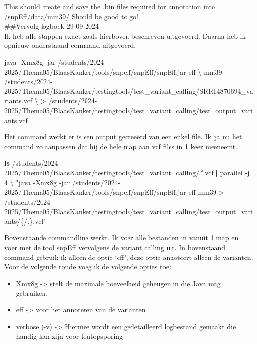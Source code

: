 \documentclass[
]{article}
\newenvironment{Shaded}{\begin{snugshade}}{\end{snugshade}}
\newcommand{\AttributeTok}[1]{\textcolor[rgb]{0.13,0.29,0.53}{#1}}
\newcommand{\DataTypeTok}[1]{\textcolor[rgb]{0.13,0.29,0.53}{#1}}
\newcommand{\ExtensionTok}[1]{#1}
\newcommand{\FunctionTok}[1]{\textcolor[rgb]{0.13,0.29,0.53}{\textbf{#1}}}
\newcommand{\KeywordTok}[1]{\textcolor[rgb]{0.13,0.29,0.53}{\textbf{#1}}}
\newcommand{\NormalTok}[1]{#1}
\newcommand{\OperatorTok}[1]{\textcolor[rgb]{0.81,0.36,0.00}{\textbf{#1}}}
\newcommand{\PreprocessorTok}[1]{\textcolor[rgb]{0.56,0.35,0.01}{\textit{#1}}}
\newcommand{\StringTok}[1]{\textcolor[rgb]{0.31,0.60,0.02}{#1}}
\providecommand{\tightlist}{%
  \setlength{\itemsep}{0pt}\setlength{\parskip}{0pt}}
\begin{document}
This should create and save the .bin files required for annotation into
/snpEff/data/mm39/ Should be good to go!\\

\#\#Vervolg logboek 29-09-2024\\
Ik heb alle stappen exact zoals hierboven beschreven uitgevoerd. Daarna
heb ik opnieuw onderstaand command uitgevoerd.\\

\begin{Shaded}
\begin{Highlighting}[]
\ExtensionTok{java} \AttributeTok{{-}Xmx8g} \AttributeTok{{-}jar}\NormalTok{ /students/2024{-}2025/Thema05/BlaasKanker/tools/snpeff/snpEff/snpEff.jar eff }\DataTypeTok{\textbackslash{}}
\NormalTok{mm39 /students/2024{-}2025/Thema05/BlaasKanker/testingtools/test\_variant\_calling/SRR14870694\_variants.vcf }\DataTypeTok{\textbackslash{}}
\OperatorTok{\textgreater{}}\NormalTok{ /students/2024{-}2025/Thema05/BlaasKanker/testingtools/test\_variant\_calling/test\_output\_variants.vcf}
\end{Highlighting}
\end{Shaded}

Het command werkt er is een output gecreeërd van een enkel file. Ik ga
nu het command zo aanpassen dat hij de hele map aan vcf files in 1 keer
meeneemt.\\

\begin{Shaded}
\begin{Highlighting}[]
\FunctionTok{ls}\NormalTok{ /students/2024{-}2025/Thema05/BlaasKanker/testingtools/test\_variant\_calling/}\PreprocessorTok{*}\NormalTok{.vcf }\KeywordTok{|} \ExtensionTok{parallel} \AttributeTok{{-}j}\NormalTok{ 4 }\DataTypeTok{\textbackslash{}}
\StringTok{"java {-}Xmx8g {-}jar /students/2024{-}2025/Thema05/BlaasKanker/tools/snpeff/snpEff/snpEff.jar eff mm39 \textgreater{} /students/2024{-}2025/Thema05/BlaasKanker/testingtools/test\_variant\_calling/test\_output\_variants/\{/.\}.vcf"}
\end{Highlighting}
\end{Shaded}

Bovenstaande commandline werkt. Ik voer alle bestanden in vanuit 1 map
en voer met de tool snpEff vervolgens de variant calling uit. In
bovenstaand command gebruik ik alleen de optie `eff', deze optie
annoteert alleen de varianten. Voor de volgende ronde voeg ik de
volgende opties toe:\\

\begin{itemize}
\tightlist
\item
  Xmx8g -\textgreater{} stelt de maximale hoeveelheid geheugen in die
  Java mag gebruiken.\\
\item
  eff -\textgreater{} voor het annoteren van de varianten\\
\item
  verbose (-v) -\textgreater{} Hiermee wordt een gedetailleerd
  logbestand gemaakt die handig kan zijn voor foutopsporing\\
\end{itemize}
\end{document}
